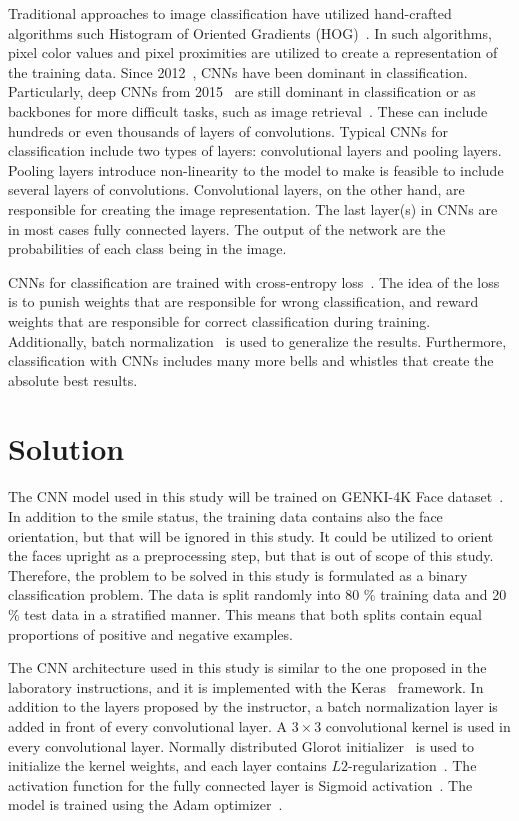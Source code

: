 \documentclass{article}
\begin{document}
Traditional approaches to image classification have utilized
hand-crafted algorithms such Histogram of Oriented Gradients
(HOG)~\cite{hogs}. In such algorithms, pixel color values and pixel
proximities are utilized to create a representation of the training
data. Since 2012~\cite{krizhevsky_2017}, CNNs have been dominant in
classification. Particularly, deep CNNs from 2015~\cite{he_2015} are
still dominant in classification or as backbones for more difficult
tasks, such as image retrieval~\cite{teichmann_2018}. These can
include hundreds or even thousands of layers of convolutions. Typical
CNNs for classification include two types of layers: convolutional
layers and pooling layers. Pooling layers introduce non-linearity to
the model to make is feasible to include several layers of
convolutions. Convolutional layers, on the other hand, are responsible
for creating the image representation. The last layer(s) in CNNs are
in most cases fully connected layers. The output of the network are
the probabilities of each class being in the image.~\cite{cs231n}

CNNs for classification are trained with cross-entropy loss~\cite[Ch.
  6]{goodfellow_2016}. The idea of the loss is to punish weights that
are responsible for wrong classification, and reward weights that are
responsible for correct classification during training. Additionally,
batch normalization~\cite{ioffe_2015} is used to generalize the
results. Furthermore, classification with CNNs includes many more
bells and whistles that create the absolute best results.

\section{Solution}\label{sec:solution}
The CNN model used in this study will be trained on GENKI-4K Face
dataset~\cite{GENKI-4K}. In addition to the smile status, the training
data contains also the face orientation, but that will be ignored in
this study. It could be utilized to orient the faces upright as a
preprocessing step, but that is out of scope of this study. Therefore,
the problem to be solved in this study is formulated as a binary
classification problem. The data is split randomly into 80 \% training
data and 20 \% test data in a stratified manner. This means that both
splits contain equal proportions of positive and negative examples.

The CNN architecture used in this study is similar to the one proposed
in the laboratory instructions, and it is implemented with the
Keras~\cite{keras} framework. In addition to the layers proposed by
the instructor, a batch normalization layer is added in front of every
convolutional layer. A $3 \times 3$ convolutional kernel is used in
every convolutional layer. Normally distributed Glorot
initializer~\cite{glorot10a} is used to initialize the kernel weights,
and each layer contains $L2$-regularization~\cite[Ch.
  7]{goodfellow_2016}. The activation function for the fully connected
layer is Sigmoid activation~\cite[Ch. 6]{goodfellow_2016}. The model
is trained using the Adam optimizer~\cite{adam_optimizer}.
\end{document}
